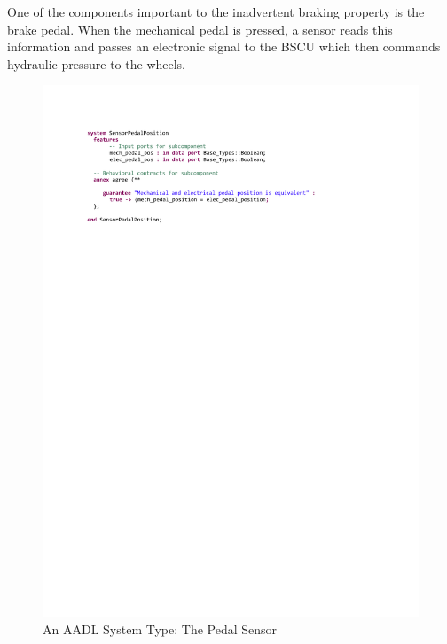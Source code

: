 One of the components important to the inadvertent braking property is the brake pedal. When the mechanical pedal is pressed, a sensor reads this information and passes an electronic signal to the BSCU which then commands hydraulic pressure to the wheels. 

\begin{figure}[h!]
	\hspace*{-2cm}
	\vspace{-0.55in} 
	\begin{center}
		\includegraphics[trim=0 640 -10 70,clip,width=1.5\dimexpr\textwidth-2cm\relax]{images/system_sensor.pdf}
		\vspace{-0.3in}
		\caption{An AADL System Type: The Pedal Sensor}
		\label{fig:sensor}
	\end{center}
	\vspace{-0.4in}
\end{figure}

